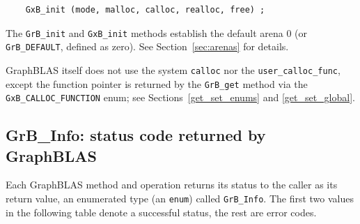     {\footnotesize
    \begin{verbatim}
    GxB_init (mode, malloc, calloc, realloc, free) ; \end{verbatim}}

The \verb'GrB_init' and \verb'GxB_init' methods establish the default arena 0
(or \verb'GrB_DEFAULT', defined as zero).  See Section~\ref{sec:arenas} for
details.

GraphBLAS itself does not use the system \verb'calloc' nor the
\verb'user_calloc_func', except the function pointer is returned by the
\verb'GrB_get' method via the \verb'GxB_CALLOC_FUNCTION' enum; see
Sections~\ref{get_set_enums} and \ref{get_set_global}.

\subsection{{\sf GrB\_Info:} status code returned by GraphBLAS} %
\label{info}

Each GraphBLAS method and operation returns its status to the caller as its
return value, an enumerated type (an \verb'enum') called \verb'GrB_Info'.  The
first two values in the following table denote a successful status, the rest
are error codes.

